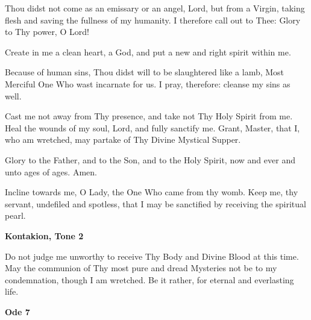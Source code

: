 \begin{hang}
\noindent{}Thou didst not come as an emissary or an angel, Lord, but from a Virgin, taking flesh and saving the fullness of my humanity. I therefore call out to Thee: Glory to Thy power, O Lord!

Create in me a clean heart, a God, and put a new and right spirit within me.

Because of human sins, Thou didst will to be slaughtered like a lamb, Most Merciful One Who wast incarnate for us. I pray, therefore: cleanse my sins as well.

Cast me not away from Thy presence, and take not Thy Holy Spirit from me. Heal the wounds of my soul, Lord, and fully sanctify me. Grant, Master, that I, who am wretched, may partake of Thy Divine Mystical Supper.

Glory to the Father, and to the Son, and to the Holy Spirit, now and ever and unto ages of ages. Amen.

Incline towards me, O Lady, the One Who came from thy womb. Keep me, thy servant, undefiled and spotless, that I may be sanctified by receiving the spiritual pearl.

\end{hang}

\begin{center}
	\textbf{Kontakion, Tone 2}
\end{center}

Do not judge me unworthy to receive Thy Body and Divine Blood at this time. May the communion of Thy most pure and dread Mysteries not be to my condemnation, though I am wretched. Be it rather, for eternal and everlasting life.

\begin{center}
	\textbf{Ode 7}
\end{center}

